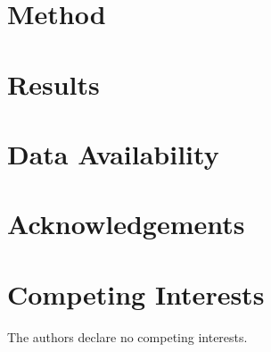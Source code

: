 \documentclass[%
 preprint,
superscriptaddress,
 amsmath,amssymb,
 aps,
 prb,
 linenumbers,
]{revtex4-2}
\begin{document}
\section*{Method}


\section*{Results}




\section*{Data Availability}





\section*{Acknowledgements}



\section*{Competing Interests}

The authors declare no competing interests.



\end{document}
